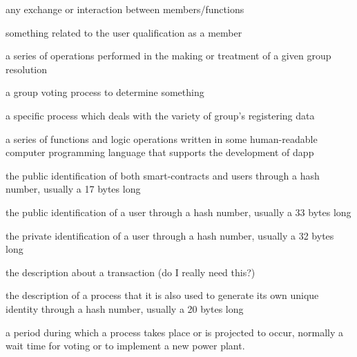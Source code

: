 \begin{description}[align=right, labelwidth=2.5cm, leftmargin=\labelwidth+\labelsep]
            \item[transaction] any exchange or interaction between members/functions
            \item[membership] something related to the user qualification as a member
            \item[process] a series of operations performed in the making or treatment of a given group resolution
            \item[ballot] a group voting process to determine something
            \item[change] a specific process which deals with the variety of group's registering data
            \item[smart-contract] a series of functions and logic operations written in some human-readable computer programming language that supports the development of \gls{dapp}
            \item[address] the public identification of both smart-contracts and users through a hash number, usually a 17 bytes long
            \item[public key] the public identification of a user through a hash number, usually a 33 bytes long
            \item[private key] the private identification of a user through a hash number, usually a 32 bytes long
            \item[statement] the description about a transaction (do I really need this?)
            \item[proposal] the description of a process that it is also used to generate its own unique identity through a hash number, usually a 20 bytes long
            \item[timeframe] a period during which a process takes place or is projected to occur, normally a wait time for voting or to implement a new power plant.
        \end{description}


